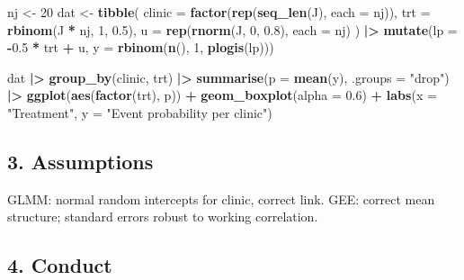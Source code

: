 \documentclass[
]{article}
\newenvironment{Shaded}{\begin{snugshade}}{\end{snugshade}}
\newcommand{\AttributeTok}[1]{\textcolor[rgb]{0.13,0.29,0.53}{#1}}
\newcommand{\DecValTok}[1]{\textcolor[rgb]{0.00,0.00,0.81}{#1}}
\newcommand{\FloatTok}[1]{\textcolor[rgb]{0.00,0.00,0.81}{#1}}
\newcommand{\FunctionTok}[1]{\textcolor[rgb]{0.13,0.29,0.53}{\textbf{#1}}}
\newcommand{\NormalTok}[1]{#1}
\newcommand{\OtherTok}[1]{\textcolor[rgb]{0.56,0.35,0.01}{#1}}
\newcommand{\SpecialCharTok}[1]{\textcolor[rgb]{0.81,0.36,0.00}{\textbf{#1}}}
\newcommand{\StringTok}[1]{\textcolor[rgb]{0.31,0.60,0.02}{#1}}
\begin{document}
\begin{Shaded}
\begin{Highlighting}[]
\NormalTok{nj }\OtherTok{\textless{}{-}} \DecValTok{20}
\NormalTok{dat }\OtherTok{\textless{}{-}} \FunctionTok{tibble}\NormalTok{(}
  \AttributeTok{clinic =} \FunctionTok{factor}\NormalTok{(}\FunctionTok{rep}\NormalTok{(}\FunctionTok{seq\_len}\NormalTok{(J), }\AttributeTok{each =}\NormalTok{ nj)),}
  \AttributeTok{trt    =} \FunctionTok{rbinom}\NormalTok{(J }\SpecialCharTok{*}\NormalTok{ nj, }\DecValTok{1}\NormalTok{, }\FloatTok{0.5}\NormalTok{),}
  \AttributeTok{u      =} \FunctionTok{rep}\NormalTok{(}\FunctionTok{rnorm}\NormalTok{(J, }\DecValTok{0}\NormalTok{, }\FloatTok{0.8}\NormalTok{), }\AttributeTok{each =}\NormalTok{ nj)}
\NormalTok{) }\SpecialCharTok{|\textgreater{}}
  \FunctionTok{mutate}\NormalTok{(}\AttributeTok{lp =} \SpecialCharTok{{-}}\FloatTok{0.5} \SpecialCharTok{*}\NormalTok{ trt }\SpecialCharTok{+}\NormalTok{ u,}
         \AttributeTok{y  =} \FunctionTok{rbinom}\NormalTok{(}\FunctionTok{n}\NormalTok{(), }\DecValTok{1}\NormalTok{, }\FunctionTok{plogis}\NormalTok{(lp)))}

\NormalTok{dat }\SpecialCharTok{|\textgreater{}}
  \FunctionTok{group\_by}\NormalTok{(clinic, trt) }\SpecialCharTok{|\textgreater{}}
  \FunctionTok{summarise}\NormalTok{(}\AttributeTok{p =} \FunctionTok{mean}\NormalTok{(y), }\AttributeTok{.groups =} \StringTok{"drop"}\NormalTok{) }\SpecialCharTok{|\textgreater{}}
  \FunctionTok{ggplot}\NormalTok{(}\FunctionTok{aes}\NormalTok{(}\FunctionTok{factor}\NormalTok{(trt), p)) }\SpecialCharTok{+}
  \FunctionTok{geom\_boxplot}\NormalTok{(}\AttributeTok{alpha =} \FloatTok{0.6}\NormalTok{) }\SpecialCharTok{+}
  \FunctionTok{labs}\NormalTok{(}\AttributeTok{x =} \StringTok{"Treatment"}\NormalTok{, }\AttributeTok{y =} \StringTok{"Event probability per clinic"}\NormalTok{)}
\end{Highlighting}
\end{Shaded}

\subsection{3. Assumptions}\label{assumptions}

GLMM: normal random intercepts for clinic, correct link. GEE: correct
mean structure; standard errors robust to working correlation.

\subsection{4. Conduct}\label{conduct}
\end{document}
